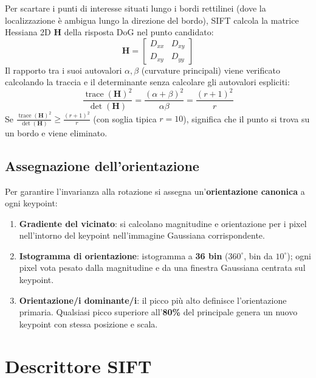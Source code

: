 \documentclass[12pt, a4paper]{report}
\DeclareMathOperator{\trace}{trace}
\begin{document}
\begin{propbox}
Per scartare i punti di interesse situati lungo i bordi rettilinei (dove la localizzazione è ambigua lungo la direzione del bordo), SIFT calcola la matrice Hessiana 2D $\mathbf{H}$ della risposta DoG nel punto candidato:
\[
  \mathbf{H} = \begin{bmatrix} D_{xx} & D_{xy} \\ D_{xy} & D_{yy} \end{bmatrix}
\]
Il rapporto tra i suoi autovalori $\alpha, \beta$ (curvature principali) viene verificato calcolando la traccia e il determinante senza calcolare gli autovalori espliciti:
\[
  \frac{\trace(\mathbf{H})^2}{\det(\mathbf{H})} = \frac{(\alpha + \beta)^2}{\alpha \beta} = \frac{(r+1)^2}{r}
\]
Se $\frac{\trace(\mathbf{H})^2}{\det(\mathbf{H})} \ge \frac{(r+1)^2}{r}$ (con soglia tipica $r=10$), significa che il punto si trova su un bordo e viene eliminato.
\end{propbox}

\subsection{Assegnazione dell'orientazione}

Per garantire l'invarianza alla rotazione si assegna un'\textbf{orientazione
canonica} a ogni keypoint:

\begin{enumerate}
  \item \textbf{Gradiente del vicinato}: si calcolano magnitudine e orientazione
        per i pixel nell'intorno del keypoint nell'immagine Gaussiana
        corrispondente.
  \item \textbf{Istogramma di orientazione}: istogramma a \textbf{36 bin}
        ($360^{\circ}$, bin da $10^{\circ}$); ogni pixel vota pesato dalla magnitudine e da
        una finestra Gaussiana centrata sul keypoint.
  \item \textbf{Orientazione/i dominante/i}: il picco più alto definisce
        l'orientazione primaria. Qualsiasi picco superiore all'\textbf{80\%}
        del principale genera un nuovo keypoint con stessa posizione e scala.
\end{enumerate}

\section{Descrittore SIFT}
\end{document}
